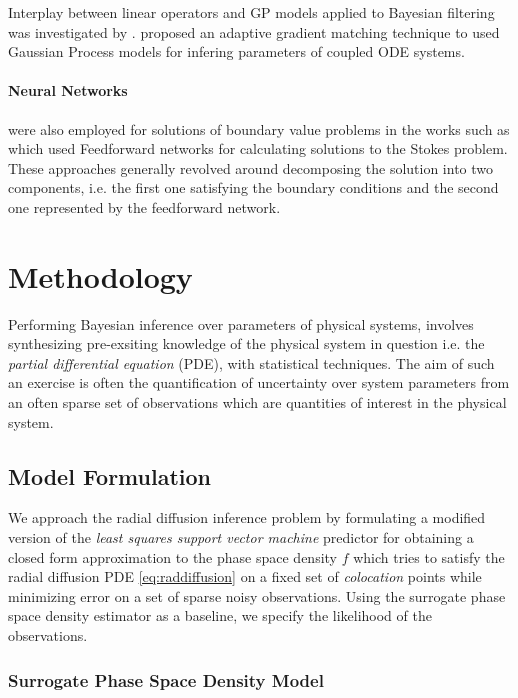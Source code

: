 Interplay between linear operators and GP models applied to Bayesian filtering was investigated by \citet{Sarkka2011}. 
\citet{pmlr-v31-dondelinger13a} proposed an adaptive gradient matching technique to used Gaussian Process models for 
infering parameters of coupled ODE systems.

\paragraph{Neural Networks} were also employed for solutions of boundary value problems in the works such as 
\citet{Lagaris,Aarts2001,TSOULOS20092385,Baymani2011} which used Feedforward networks for 
calculating solutions to the Stokes problem. These approaches generally revolved around decomposing the solution 
into two components, i.e. the first one satisfying the boundary conditions and the second one represented by the 
feedforward network.


\section{Methodology}

Performing Bayesian inference over parameters of physical systems,
involves synthesizing pre-exsiting knowledge of the physical system in
question i.e. the \emph{partial differential equation} (PDE), with
statistical techniques. The aim of such an exercise is often the
quantification of uncertainty over system parameters from an often
sparse set of observations which are quantities of interest in the
physical system. 


\subsection{Model Formulation}

We approach the radial diffusion inference problem by formulating a
modified version of the \emph{least squares support vector machine}
predictor for obtaining a closed form approximation to the phase space
density $f$ which tries to satisfy the radial diffusion PDE
\ref{eq:raddiffusion} on a fixed set of \emph{colocation} points while
minimizing error on a set of sparse noisy observations. 
Using the surrogate phase space density estimator as a baseline, we
specify the likelihood of the observations.


\subsubsection*{Surrogate Phase Space Density Model}

